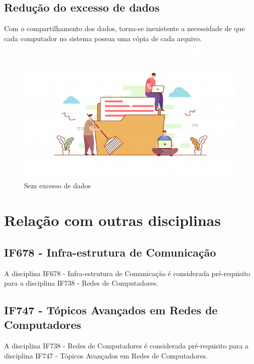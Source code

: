 \documentclass[12pt]{article}%
\begin{document}
\subsection{Redução do excesso de dados}
\par Com o compartilhamento dos dados, torna-se inexistente a necessidade de que cada computador no sistema possua uma cópia de cada arquivo.\citep{youtube}
\begin{figure}[h]
    \centering
    \includegraphics[scale = 0.8]{limpezadados.jpg}
    \caption{Sem excesso de dados\citep{limpezadados}}
\end{figure}

\section{Rela\c c\~ao com outras disciplinas}

\subsection{IF678 - Infra-estrutura de Comunicação}
\par A disciplina IF678 - Infra-estrutura de Comunicação é considerada pré-requisito para a disciplina IF738 - Redes de Computadores.\citep{perfil}

\subsection{IF747 - Tópicos Avançados em Redes de Computadores}
\par A disciplina IF738 - Redes de Computadores é considerada pré-requisito para a disciplina IF747 - Tópicos Avançados em Redes de Computadores.\citep{perfil}



\end{document}
